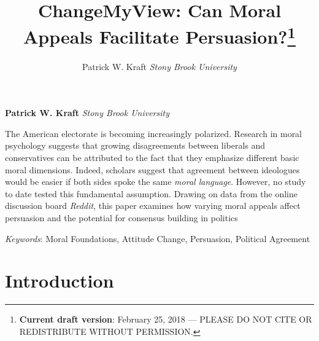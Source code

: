 \documentclass[11pt,]{article}
\title{ChangeMyView: Can Moral Appeals Facilitate Persuasion?\thanks{\textbf{Current draft version}: February 25, 2018 --- PLEASE DO NOT CITE
OR REDISTRIBUTE WITHOUT PERMISSION.}  }
\author{\Large Patrick W. Kraft\vspace{0.05in} \newline\normalsize\emph{Stony Brook University}  }
\date{}
\newcommand*{\authorfont}{\fontfamily{phv}\selectfont}
\renewenvironment{abstract}
 {{%
    \setlength{\leftmargin}{0mm}
    \setlength{\rightmargin}{\leftmargin}%
  }%
  \relax}
 {\endlist}
\begin{document}
	
%

{%
\setlength{\parindent}{0pt}
\thispagestyle{plain}
{\fontsize{18}{20}\selectfont\raggedright 
\maketitle  %

}

{
   \vskip 13.5pt\relax \normalsize\fontsize{11}{12} 
\textbf{\authorfont Patrick W. Kraft} \hskip 15pt \emph{\small Stony Brook University}   

}

}








\begin{abstract}

    \hbox{\vrule height .2pt width 39.14pc}

    \vskip 8.5pt %

\noindent The American electorate is becoming increasingly polarized. Research in
moral psychology suggests that growing disagreements between liberals
and conservatives can be attributed to the fact that they emphasize
different basic moral dimensions. Indeed, scholars suggest that
agreement between ideologues would be easier if both sides spoke the
same \emph{moral language}. However, no study to date tested this
fundamental assumption. Drawing on data from the online discussion board
\emph{Reddit}, this paper examines how varying moral appeals affect
persuasion and the potential for consensus building in politics


\vskip 8.5pt \noindent \emph{Keywords}: Moral Foundations, Attitude Change, Persuasion, Political Agreement \par

    \hbox{\vrule height .2pt width 39.14pc}



\end{abstract}


\vskip 6.5pt


\noindent \doublespacing \section{Introduction}\label{introduction}
\end{document}
